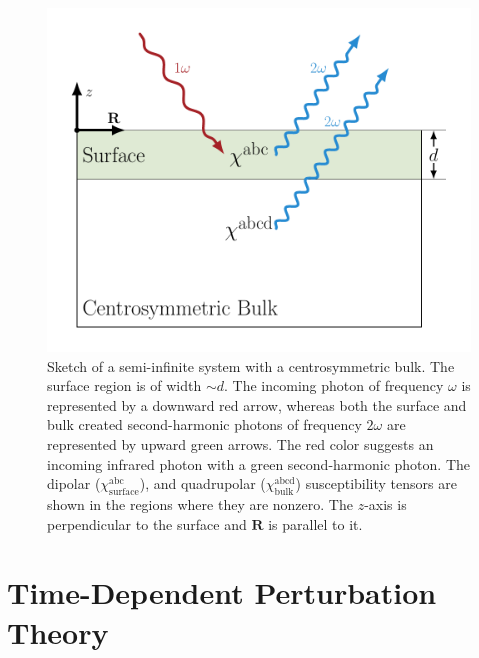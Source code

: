 \begin{figure}[t]
\centering
\includegraphics[scale=0.6]{content/figures/diag-system}
\caption[Sketch of a semi-infinite system with a centrosymmetric bulk.]
{Sketch of a semi-infinite system with a centrosymmetric bulk. The surface
region is of width $\sim d$. The incoming photon of frequency $\omega$ is
represented by a downward red arrow, whereas both the surface and bulk created
second-harmonic photons of frequency $2\omega$ are represented by upward green
arrows. The red color suggests an incoming infrared photon with a green
second-harmonic photon. The dipolar ($\chi^{\mathrm{abc}}_{\mathrm{surface}}$),
and quadrupolar ($\chi^{\mathrm{abcd}}_{\mathrm{bulk}}$) susceptibility tensors
are shown in the regions where they are nonzero. The $z$-axis is perpendicular
to the surface and $\mathbf{R}$ is parallel to it.}
\label{fig:fsystem}
\end{figure}



\section{Time-Dependent Perturbation Theory}\label{tdpt}

